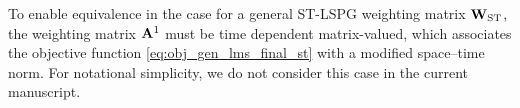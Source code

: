 \begin{remark}
To enable equivalence in the case for a general ST-LSPG weighting matrix
	$\mathbf{W}_{\text{ST}}$, the weighting matrix $\mathbf{A}^{1}$
	must be time dependent matrix-valued, which associates the objective function 
	\eqref{eq:obj_gen_lms_final_st} with a modified space--time
	norm. For notational simplicity, we do not consider this case in the current
	manuscript.
\end{remark}
 
